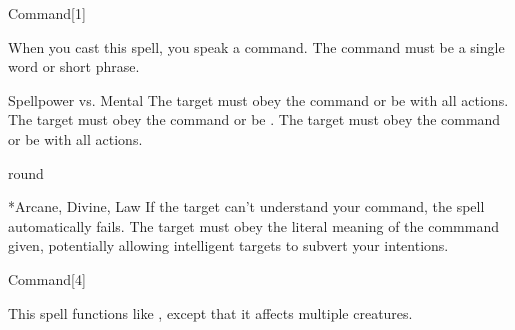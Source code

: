 \begin{spellsection}{Command}[1]
    \begin{spellheader}
    \end{spellheader}
    \begin{spellcontent}
        \begin{spelltargetinginfo}
        \end{spelltargetinginfo}
        \begin{spelleffects}
            \spellspecial When you cast this spell, you speak a command. The command must be a single word or short phrase.
            \begin{spellattack}{Spellpower vs. Mental}
                \spellsuccess The target must obey the command or be \severelyimpaired with all actions.
                \spellcritical The target must obey the command or be \stunned.
                \spellfailure The target must obey the command or be \impaired with all actions.
            \end{spellattack}
             round
        \end{spelleffects}
    \end{spellcontent}
    \begin{spellfooter}
        *{Arcane, Divine, Law}
        \spellnotes If the target can't understand your command, the spell automatically fails. The target must obey the literal meaning of the commmand given, potentially allowing intelligent targets to subvert your intentions.
        \miscastrandom
    \end{spellfooter}
\end{spellsection}

\begin{spellsection}[Mass]{Command}[4]
    \begin{spellheader}
    \end{spellheader}
    \begin{spellcontent}
        \begin{spelltargetinginfo}
        \end{spelltargetinginfo}
        \begin{spelleffects}
            \spellspecial This spell functions like , except that it affects multiple creatures.
        \end{spelleffects}
    \end{spellcontent}
    \begin{spellfooter}
        \miscastexplode
    \end{spellfooter}
\end{spellsection}

